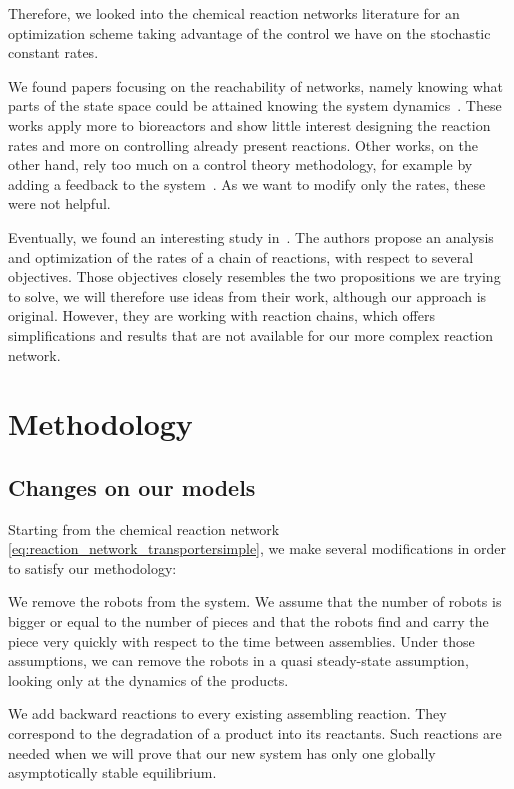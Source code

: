 	Therefore, we looked into the chemical reaction networks literature for an optimization scheme taking advantage of the control we have on the stochastic constant rates.
	
	We found papers focusing on the reachability of networks, namely knowing what parts of the state space could be attained knowing the system dynamics~\cite{Berman:2007p10105, Bastin:1993p10351, Kloetzer:2006p9623, Bastin:1990p10531, Batt:2007p9650}. These works apply more to bioreactors and show little interest designing the reaction rates and more on controlling already present reactions.
	Other works, on the other hand, rely too much on a control theory methodology, for example by adding a feedback to the system~\cite{OteroMuras:2008p10653, Iglesias:2007p9153, Belta:2002p12009, Belta:2006p9642}. As we want to modify only the rates, these were not helpful.
	
	Eventually, we found an interesting study in~\cite{Schuster:1987p11838}. The authors propose an analysis and optimization of the rates of a chain of reactions, with respect to several objectives. Those objectives closely resembles the two propositions we are trying to solve, we will therefore use ideas from their work, although our approach is original. However, they are working with reaction chains, which offers simplifications and results that are not available for our more complex reaction network.
	

\section{Methodology} %

	\subsection{Changes on our models} %
	\label{sub:changes_on_our_models}

		Starting from the chemical reaction network \eqref{eq:reaction_network_transportersimple}, we make several modifications in order to satisfy our methodology:
		
		\begin{my_enumerate}
			\item We remove the robots from the system. We assume that the number of robots is bigger or equal to the number of pieces and that the robots find and carry the piece very quickly with respect to the time between assemblies. Under those assumptions, we can remove the robots in a quasi steady-state assumption, looking only at the dynamics of the products.
			\item We add backward reactions to every existing assembling reaction. They correspond to the degradation of a product into its reactants. Such reactions are needed when we will prove that our new system has only one globally asymptotically stable equilibrium.
		\end{my_enumerate}
		
